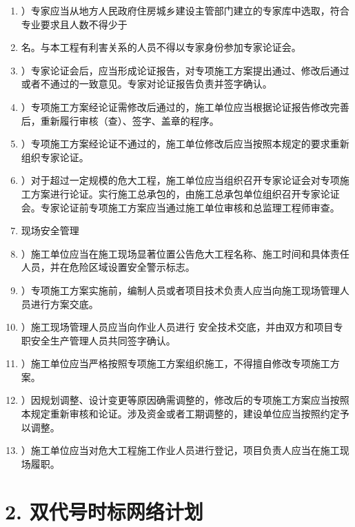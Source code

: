 \documentclass[UTF8,fontset=fandol,11pt]{ctexart}
\begin{document}
\begin{enumerate}[label=\arabic*.]
\item ）专家应当从地方人民政府住房城乡建设主管部门建立的专家库中选取，符合专业要求且人数不得少于

\item 名。与本工程有利害关系的人员不得以专家身份参加专家论证会。

\item ）专家论证会后，应当形成论证报告，对专项施工方案提出通过、修改后通过或者不通过的一致意见。专家对论证报告负责并签字确认。

\item ）专项施工方案经论证需修改后通过的，施工单位应当根据论证报告修改完善后，重新履行审核（查）、签字、盖章的程序。

\item ）专项施工方案经论证不通过的，施工单位修改后应当按照本规定的要求重新组织专家论证。

\item ）对于超过一定规模的危大工程，施工单位应当组织召开专家论证会对专项施工方案进行论证。实行施工总承包的，由施工总承包单位组织召开专家论证会。专家论证前专项施工方案应当通过施工单位审核和总监理工程师审查。

\item 现场安全管理

\item ）施工单位应当在施工现场显著位置公告危大工程名称、施工时间和具体责任人员，并在危险区域设置安全警示标志。

\item ）专项施工方案实施前，编制人员或者项目技术负责人应当向施工现场管理人员进行方案交底。

\item ）施工现场管理人员应当向作业人员进行 安全技术交底，并由双方和项目专职安全生产管理人员共同签字确认。

\item ）施工单位应当严格按照专项施工方案组织施工，不得擅自修改专项施工方案。

\item ）因规划调整、设计变更等原因确需调整的，修改后的专项施工方案应当按照本规定重新审核和论证。涉及资金或者工期调整的，建设单位应当按照约定予以调整。

\item ）施工单位应当对危大工程施工作业人员进行登记，项目负责人应当在施工现场履职。

\end{enumerate}

\newpage

\section*{2. 双代号时标网络计划}
\end{document}
